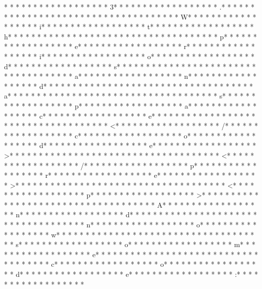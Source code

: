 * * *  * * *  * * *  *  * * *  *  * * *  * 3* * *  * * *  * * *  *  * * *  *  * * *  * .* * *  * * *  * * *  *  * * *  *  * * *  *  * * *  * * *  * * *  *  * * *  *  * * *  * W* * *  * * *  * * *  *  * * *  *  * * *  * i* * *  * * *  * * *  *  * * *  *  * * *  * t* * *  * * *  * * *  *  * * *  *  * * *  * h* * *  * * *  * * *  *  * * *  *  * * *  *  * * *  * * *  * * *  *  * * *  *  * * *  * p* * *  * * *  * * *  *  * * *  *  * * *  * e* * *  * * *  * * *  *  * * *  *  * * *  * r* * *  * * *  * * *  *  * * *  *  * * *  * i* * *  * * *  * * *  *  * * *  *  * * *  * o* * *  * * *  * * *  *  * * *  *  * * *  * d* * *  * * *  * * *  *  * * *  *  * * *  * s* * *  * * *  * * *  *  * * *  *  * * *  *  * * *  * * *  * * *  *  * * *  *  * * *  * a* * *  * * *  * * *  *  * * *  *  * * *  * n* * *  * * *  * * *  *  * * *  *  * * *  * d* * *  * * *  * * *  *  * * *  *  * * *  *  * * *  * * *  * * *  *  * * *  *  * * *  * a* * *  * * *  * * *  *  * * *  *  * * *  *  * * *  * * *  * * *  *  * * *  *  * * *  * s* * *  * * *  * * *  *  * * *  *  * * *  * p* * *  * * *  * * *  *  * * *  *  * * *  * a* * *  * * *  * * *  *  * * *  *  * * *  * c* * *  * * *  * * *  *  * * *  *  * * *  * e* * *  * * *  * * *  *  * * *  *  * * *  * 
* * *  * * *  * * *  *  * * *  *  * * *  * <* * *  * * *  * * *  *  * * *  *  * * *  * /* * *  * * *  * * *  *  * * *  *  * * *  * c* * *  * * *  * * *  *  * * *  *  * * *  * o* * *  * * *  * * *  *  * * *  *  * * *  * d* * *  * * *  * * *  *  * * *  *  * * *  * e* * *  * * *  * * *  *  * * *  *  * * *  * >* * *  * * *  * * *  *  * * *  *  * * *  * 
* * *  * * *  * * *  *  * * *  *  * * *  * <* * *  * * *  * * *  *  * * *  *  * * *  * /* * *  * * *  * * *  *  * * *  *  * * *  * p* * *  * * *  * * *  *  * * *  *  * * *  * r* * *  * * *  * * *  *  * * *  *  * * *  * e* * *  * * *  * * *  *  * * *  *  * * *  * >* * *  * * *  * * *  *  * * *  *  * * *  * 
* * *  * * *  * * *  *  * * *  *  * * *  * <* * *  * * *  * * *  *  * * *  *  * * *  * p* * *  * * *  * * *  *  * * *  *  * * *  * >* * *  * * *  * * *  *  * * *  *  * * *  * 
* * *  * * *  * * *  *  * * *  *  * * *  * A* * *  * * *  * * *  *  * * *  *  * * *  * n* * *  * * *  * * *  *  * * *  *  * * *  * d* * *  * * *  * * *  *  * * *  *  * * *  *  * * *  * * *  * * *  *  * * *  *  * * *  * n* * *  * * *  * * *  *  * * *  *  * * *  * o* * *  * * *  * * *  *  * * *  *  * * *  * w* * *  * * *  * * *  *  * * *  *  * * *  *  * * *  * * *  * * *  *  * * *  *  * * *  * s* * *  * * *  * * *  *  * * *  *  * * *  * o* * *  * * *  * * *  *  * * *  *  * * *  * m* * *  * * *  * * *  *  * * *  *  * * *  * e* * *  * * *  * * *  *  * * *  *  * * *  *  * * *  * * *  * * *  *  * * *  *  * * *  * c* * *  * * *  * * *  *  * * *  *  * * *  * o* * *  * * *  * * *  *  * * *  *  * * *  * d* * *  * * *  * * *  *  * * *  *  * * *  * e* * *  * * *  * * *  *  * * *  *  * * *  * :* * *  * * *  * * *  *  * * *  *  * * *  * 
